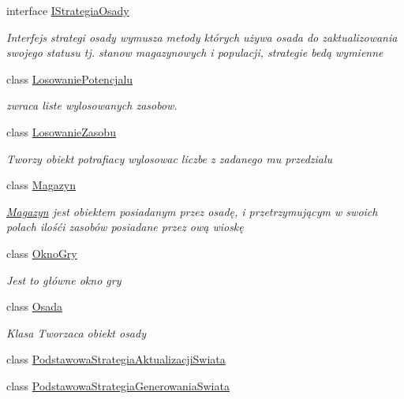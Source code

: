 \begin{DoxyCompactItemize}
interface \hyperlink{interface_empire___simulator_1_1_i_strategia_osady}{I\+Strategia\+Osady}
\begin{DoxyCompactList}\small\item\em Interfejs strategi osady wymusza metody których używa osada do zaktualizowania swojego statusu tj. stanow magazynowych i populacji, strategie bedą wymienne \end{DoxyCompactList}\item 
class \hyperlink{class_empire___simulator_1_1_losowanie_potencjalu}{Losowanie\+Potencjalu}
\begin{DoxyCompactList}\small\item\em zwraca liste wylosowanych zasobow. \end{DoxyCompactList}\item 
class \hyperlink{class_empire___simulator_1_1_losowanie_zasobu}{Losowanie\+Zasobu}
\begin{DoxyCompactList}\small\item\em Tworzy obiekt potrafiacy wylosowac liczbe z zadanego mu przedzialu \end{DoxyCompactList}\item 
class \hyperlink{class_empire___simulator_1_1_magazyn}{Magazyn}
\begin{DoxyCompactList}\small\item\em \hyperlink{class_empire___simulator_1_1_magazyn}{Magazyn} jest obiektem posiadanym przez osadę, i przetrzymującym w swoich polach ilośći zasobów posiadane przez ową wioskę \end{DoxyCompactList}\item 
class \hyperlink{class_empire___simulator_1_1_okno_gry}{Okno\+Gry}
\begin{DoxyCompactList}\small\item\em Jest to główne okno gry \end{DoxyCompactList}\item 
class \hyperlink{class_empire___simulator_1_1_osada}{Osada}
\begin{DoxyCompactList}\small\item\em Klasa Tworzaca obiekt osady \end{DoxyCompactList}\item 
class \hyperlink{class_empire___simulator_1_1_podstawowa_strategia_aktualizacji_swiata}{Podstawowa\+Strategia\+Aktualizacji\+Swiata}
\item 
class \hyperlink{class_empire___simulator_1_1_podstawowa_strategia_generowania_swiata}{Podstawowa\+Strategia\+Generowania\+Swiata}

\end{DoxyCompactItemize}
